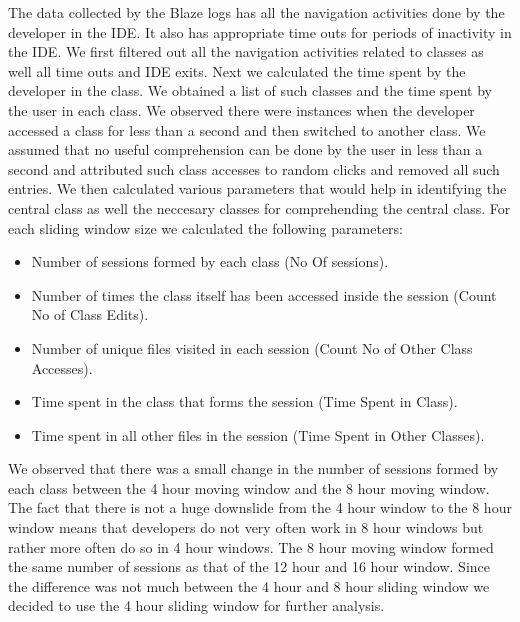 The data collected by the Blaze logs has all the navigation activities done by the developer in the IDE. It also has appropriate time outs for periods of inactivity in the IDE. We first filtered out all the navigation activities related to classes as well all time outs and IDE exits. Next we calculated the time spent by the developer in the class. We obtained a list of such classes and the time spent by the user in each class. We observed there were instances when the developer accessed a class for less than a second and then switched to another class. We assumed that no useful comprehension can be done by the user in less than a second and attributed such class accesses to random clicks and removed all such entries. We then calculated various parameters that would help in identifying the central class as well the neccesary classes for comprehending the central class. For each sliding window size we calculated the following parameters:
\begin{itemize}
	\item[] Number of sessions formed by each class (No Of sessions).
	\item[] Number of times the class itself has been accessed inside the session (Count No of Class Edits).
	\item[] Number of unique files visited in each session (Count No of Other Class Accesses).
	\item[] Time spent in the class that forms the session (Time Spent in Class).
	\item[] Time spent in all other files in the session (Time Spent in Other Classes). 
\end{itemize}
We observed that there was a small change in the number of sessions formed by each class between the 4 hour moving window and the 8 hour moving window. The fact that there is not a huge downslide from the 4 hour window to the 8 hour window means that developers do not very often work in 8 hour windows but rather more often do so in 4 hour windows. The 8 hour moving window formed the same number of sessions as that of the 12 hour and 16 hour window. Since the difference was not much between the 4 hour and 8 hour sliding window we decided to use the 4 hour sliding window for further analysis.

